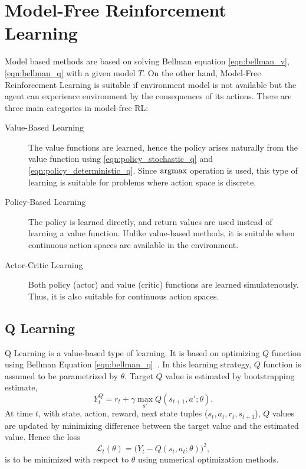 \section{Model-Free Reinforcement Learning}
\label{sec:mf_rl}

Model based methods are based on solving Bellman equation \eqref{eqn:bellman_v}, \eqref{eqn:bellman_q} with a given model $T$. 
On the other hand, Model-Free Reinforcement Learning is suitable 
if environment model is not available but the agent can experience environment by the consequences of its actions. There are three main categories in model-free RL:  

\begin{description}
	\item[Value-Based Learning] The value functions are learned, 
	hence the policy arises naturally from the value function using  \eqref{eqn:policy_stochastic_q} and \eqref{eqn:policy_deterministic_q}. 
	Since $\operatorname{\textup{argmax}}$ operation is used, this type of learning is suitable for problems where action space is discrete. 
	
	\item[Policy-Based Learning] The policy is learned directly, 
	and return values are used instead of learning a value function. 
	Unlike value-based methods, it is suitable when continuous action spaces are available in the environment. 
	
	\item[Actor-Critic Learning] Both policy (actor) and value (critic) functions are learned simulatenously. 
	Thus, it is also suitable for continuous action spaces. 
	
\end{description}

\subsection{Q Learning}
Q Learning is a value-based type of learning. 
It is based on optimizing $Q$ function using Bellman Equation \eqref{eqn:bellman_q}~\cite{watkins_technical_1992}. 
In this learning strategy, $Q$ function is assumed to be parametrized by $\theta$. 
Target $Q$ value is estimated by bootstrapping estimate, 
\begin{equation}
\label{eqn:q_target}
Y_t^Q = r_t + \gamma \max_{a'} Q(s_{t+1},a';\theta).
\end{equation}
At time $t$,  with state, action, reward, next state tuples ($s_t,a_t,r_t,s_{t+1}$), 
$Q$ values are updated by minimizing difference between the target value and the estimated value.
Hence the loss 
\begin{equation}
\label{eqn:q_loss}
\mathcal{L}_t(\theta) = \big( Y_t - Q(s_t,a_t;\theta) \big) ^ 2, 
\end{equation}
is to be minimized with respect to $\theta$ using numerical optimization methods. 

